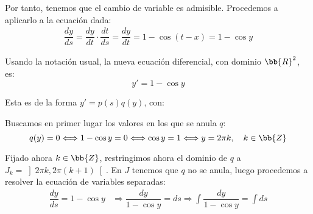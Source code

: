 \begin{ejercicio}
    Por tanto, tenemos que el cambio de variable es admisible. Procedemos a aplicarlo a la ecuación dada:
    \begin{align*}
        \dfrac{dy}{ds} = \dfrac{dy}{dt}\cdot \dfrac{dt}{ds} = \dfrac{dy}{dt} = 1-\cos(t-x) = 1-\cos y
    \end{align*}

    Usando la notación usual, la nueva ecuación diferencial, con dominio $\bb{R}^2$, es:
    \begin{equation*}
        y' = 1-\cos y
    \end{equation*}

    Esta es de la forma $y' = p(s)q(y)$, con:

    Buscamos en primer lugar los valores en los que se anula $q$:
    \begin{equation*}
        q(y) = 0 \Longleftrightarrow 1-\cos y = 0 \Longleftrightarrow \cos y = 1 \Longleftrightarrow y = 2\pi k, \quad k\in \bb{Z}
    \end{equation*}

    Fijado ahora $k\in \bb{Z}$, restringimos ahora el dominio de $q$ a $J_k=\left]2\pi k, 2\pi(k+1)\right[$. En $J$ tenemos que $q$ no se anula, luego procedemos a resolver la ecuación de variables separadas:
    \begin{align*}
        \dfrac{dy}{ds} = 1-\cos y &\Longrightarrow \dfrac{dy}{1-\cos y} = ds \Longrightarrow \int \dfrac{dy}{1-\cos y} = \int ds
    \end{align*}



\end{ejercicio}

